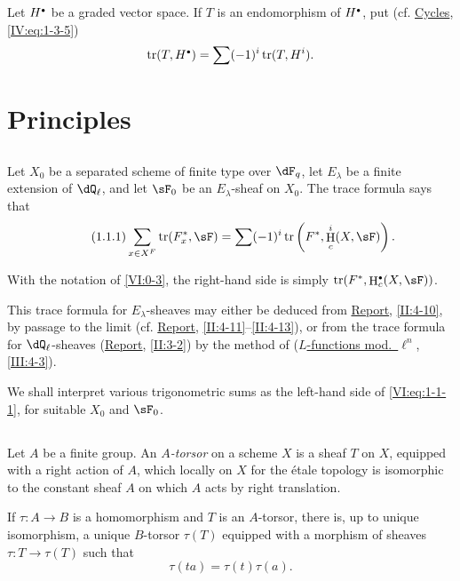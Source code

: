 \documentclass[12pt,oneside,english]{smfbook}
\DeclareMathOperator{\h}{H}
\DeclareMathOperator{\tr}{tr}
\let\oldbullet\bullet
\renewcommand{\bullet}{\textnormal{\tiny$\oldbullet$}}
\begin{document}
Let $H^\bullet$ be a graded vector space. If $T$ is an endomorphism of $H^\bullet$, put (cf. \hyperref[IV]{Cycles}, \ref{IV:eq:1-3-5})
\[
  \tr(T,H^\bullet) = \sum (-1)^i \tr(T,H^i) \text{.}
\]

\section{Principles}\label{VI:1}

\subsection{}\label{VI:1-1}

Let $X_0$ be a separated scheme of finite type over $\dF_q$, let $E_\lambda$ be a finite extension of $\dQ_\ell$, and let $\sF_0$ be an $E_\lambda$-sheaf on $X_0$. The trace formula says that
\begin{equation*}\tag{1.1.1}\label{VI:eq:1-1-1}
  \sum_{x\in X^F} \tr(F_x^\ast,\sF) = \sum (-1)^i \tr\left(F^\ast,\h_c^i(X,\sF)\right) \text{.}
\end{equation*}

With the notation of \ref{VI:0-3}, the right-hand side is simply $\tr(F^\ast,\h_c^\bullet(X,\sF))$.

This trace formula for $E_\lambda$-sheaves may either be deduced from \hyperref[II]{Report}, \ref{II:4-10}, by passage to the limit (cf. \hyperref[II]{Report}, \ref{II:4-11}--\ref{II:4-13}), or from the trace formula for $\dQ_\ell$-sheaves (\hyperref[II]{Report}, \ref{II:3-2}) by the method of (\hyperref[III]{$L$-functions mod.\ $\ell^n$}, \ref{III:4-3}).

We shall interpret various trigonometric sums as the left-hand side of \eqref{VI:eq:1-1-1}, for suitable $X_0$ and $\sF_0$.

\subsection{}\label{VI:1-2}

Let $A$ be a finite group. An \emph{$A$-torsor} on a scheme $X$ is a sheaf $T$ on $X$, equipped with a right action of $A$, which locally on $X$ for the étale topology is isomorphic to the constant sheaf $A$ on which $A$ acts by right translation.

If $\tau:A\to B$ is a homomorphism and $T$ is an $A$-torsor, there is, up to unique isomorphism, a unique $B$-torsor $\tau(T)$ equipped with a morphism of sheaves $\tau:T\to\tau(T)$ such that
\begin{equation*}\tag{1.2.1}\label{VI:eq:1-2-1}
  \tau(t a) = \tau(t) \tau(a)\text{.}
\end{equation*}
\end{document}
